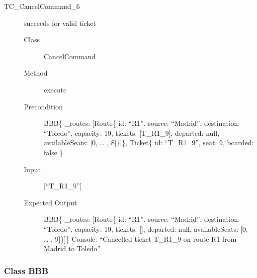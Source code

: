 \documentclass[11pt]{article}
\begin{document}
\begin{description}
\item[{TC\_CancelCommand\_6}] succeeds for valid ticket
\begin{description}
\item[{Class}] CancelCommand
\item[{Method}] execute
\item[{Precondition}] BBB\{ \_routes: [Route\{ id: “R1”, source: “Madrid”, destination: “Toledo”, capacity: 10,  tickets: [T\_R1\_9], departed: null, availableSeats: [0, … , 8]\}]\}, Ticket\{ id: “T\_R1\_9”, seat: 9, boarded: false \}
\item[{Input}] [“T\_R1\_9”]
\item[{Expected Output}] BBB\{ \_routes: [Route\{ id: “R1”, source: “Madrid”, destination: “Toledo”, capacity: 10,  tickets: [], departed: null, availableSeats: [0, … , 9]\}]\}
Console: “Cancelled ticket T\_R1\_9 on route R1 from Madrid to Toledo”
\end{description}
\end{description}

\subsubsection{Class BBB}
\label{sec:org8b65414}
\end{document}
